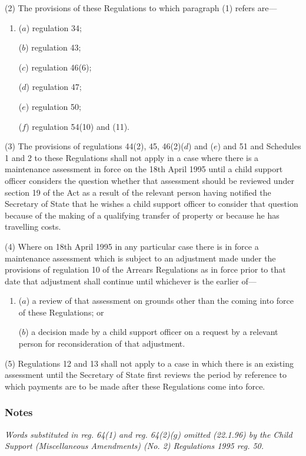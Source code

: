 \documentclass[a4paper]{article}
\newcommand\amendment[1]{\subsubsection*{Notes}{\itshape\frenchspacing\footnotesize #1 \par}}
\begin{document}
(2) The provisions of these Regulations to which paragraph (1) refers are—
\begin{enumerate}\item[]
($a$) regulation 34;

($b$) regulation 43;

($c$) regulation 46(6);

($d$) regulation 47;

($e$) regulation 50;

($f$) regulation 54(10) and (11).

\end{enumerate}

(3) The provisions of regulations 44(2), 45, 46(2)($d$) and ($e$) and 51 and Schedules 1 and 2 to these Regulations shall not apply in a case where there is a maintenance assessment in force on the 18th April 1995 until a child support officer considers the question whether that assessment should be reviewed under section 19 of the Act as a result of the relevant person having notified the Secretary of State that he wishes a child support officer to consider that question because of the making of a qualifying transfer of property or because he has travelling costs.

(4) Where on 18th April 1995 in any particular case there is in force a maintenance assessment which is subject to an adjustment made under the provisions of regulation 10 of the Arrears Regulations as in force prior to that date that adjustment shall continue until whichever is the earlier of—
\begin{enumerate}\item[]
($a$) a review of that assessment on grounds other than the coming into force of these Regulations; or

($b$) a decision made by a child support officer on a request by a relevant person for reconsideration of that adjustment.
\end{enumerate}

(5) Regulations 12 and 13 shall not apply to a case in which there is an existing assessment until the Secretary of State first reviews the period by reference to which payments are to be made after these Regulations come into force.

\amendment{
Words substituted in reg. 64(1) and reg. 64(2)($g$) omitted (22.1.96) by the Child Support (Miscellaneous Amendments) (No. 2) Regulations 1995 reg. 50.
}
\end{document}

